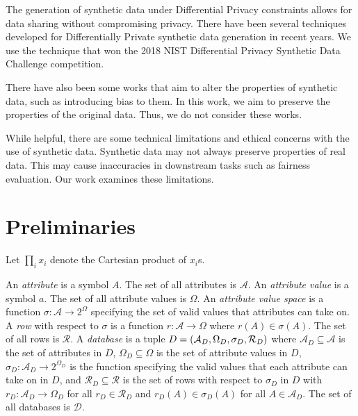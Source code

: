 \documentclass[manuscript,screen,review,anonymous]{acmart}
\DeclarePairedDelimiter{\tuple}{(}{)}
\renewcommand{\implies}{\rightarrow}
\newcommand{\db}{D}
\newcommand{\dbs}{\mathcal{D}}
\begin{document}

The generation of synthetic data\cite{raghunathan2021synthetic,lu2023machine} under Differential Privacy constraints allows for data sharing without compromising privacy\cite{tao2021benchmarking}. There have been several techniques developed for Differentially Private synthetic data generation\cite{rosenblatt2020differentially,fan2020relational,bowen2019comparative,bowen2020comparative,arnold2020really,xu2019modeling} in recent years. We use the technique that won the 2018 NIST Differential Privacy Synthetic Data Challenge competition\cite{mckenna2021winning}.

There have also been some works that aim to alter the properties of synthetic data, such as introducing bias to them\cite{jiang2024synthetic,baumann2023bias}. In this work, we aim to preserve the properties of the original data. Thus, we do not consider these works.

While helpful, there are some technical limitations\cite{stadler2022synthetic,cheng2021can,ganev2022robin,wyllie2024fairness} and ethical concerns\cite{whitney2024real} with the use of synthetic data. Synthetic data may not always preserve properties of real data. This may cause inaccuracies in downstream tasks such as fairness evaluation. Our work examines these limitations.

\section{Preliminaries}
\label{sec:prelim}

Let $\prod_i x_i$ denote the Cartesian product of $x_i$s.

An \emph{attribute} is a symbol $A$.
The set of all attributes is $\mathcal{A}$.
An \emph{attribute value} is a symbol $a$.
The set of all attribute values is $\Omega$.
An \emph{attribute value space} is a function $\sigma : \mathcal{A} \implies 2^{\Omega}$
specifying the set of valid values that attributes can take on.
A \emph{row} with respect to $\sigma$
is a function $r : \mathcal{A} \implies \Omega$
where $r(A) \in \sigma(A)$.
The set of all rows is $\mathcal{R}$.
A \emph{database} is a tuple $\db =
\tuple{
    \mathcal{A}_{\db},
    \Omega_{\db},
    \sigma_{\db},
    \mathcal{R}_{\db}
}$
where
$\mathcal{A}_{\db} \subseteq \mathcal{A}$
is the set of attributes in $\db$,
$\Omega_{\db} \subseteq \Omega$
is the set of attribute values in $\db$,
$\sigma_{\db} : \mathcal{A}_{\db} \implies 2^{\Omega_{\db}}$
is the function specifying the valid values that each attribute can take on in $\db$,
and $\mathcal{R}_{\db} \subseteq \mathcal{R}$
is the set of rows with respect to $\sigma_{\db}$ in $\db$
with $r_\db : \mathcal{A}_\db \implies \Omega_\db$
for all $r_\db \in \mathcal{R}_\db$
and $r_\db(A) \in \sigma_\db(A)$
for all $A \in \mathcal{A}_\db$.
The set of all databases is $\dbs$.
\end{document}
